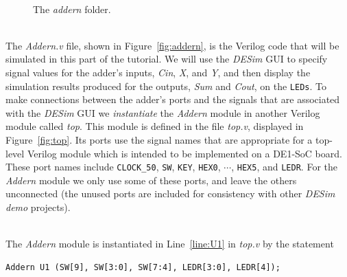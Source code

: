 \documentclass[epsfig,10pt,fullpage]{article} \addtolength{\textwidth}{1.5in}
\begin{document}
~\\
\begin{figure}[h]
	\begin{center}
        \setlength{\fboxsep}{0pt}
	\end{center}
		  \caption{The {\it addern} folder.}
	\label{fig:project}
\end{figure}

~\\
\noindent
The {\it Addern.v} file, shown in Figure~\ref{fig:addern}, is the Verilog code that will 
be simulated in this part of the tutorial. We will use the {\it DESim} GUI to specify signal 
values for the adder's inputs, {\it Cin}, {\it X}, and {\it Y}, and then display the
simulation results produced for the outputs, {\it Sum} and {\it Cout}, on the \texttt{LEDs}. 
To make connections between the adder's ports and the signals that are associated with the
{\it DESim} GUI we {\it instantiate} the {\it Addern} module in another Verilog module
called {\it top}. This module is defined in the file {\it top.v}, displayed in 
Figure~\ref{fig:top}. Its ports use the signal names that are appropriate for a
top-level Verilog module which is intended to be implemented on a DE1-SoC board. These
port names include \texttt{CLOCK\_50}, \texttt{SW}, \texttt{KEY}, \texttt{HEX0}, $\cdots$,
\texttt{HEX5}, and  \texttt{LEDR}. For the {\it Addern} module we only use some of these ports,
and leave the others unconnected (the unused ports are included for consistency with other
{\it DESim} {\it demo} projects).

~\\
\noindent
The {\it Addern} module is instantiated in Line~\ref{line:U1} in {\it top.v} by the statement

\begin{lstlisting}[]
    Addern U1 (SW[9], SW[3:0], SW[7:4], LEDR[3:0], LEDR[4]);
\end{lstlisting}
\end{document}
